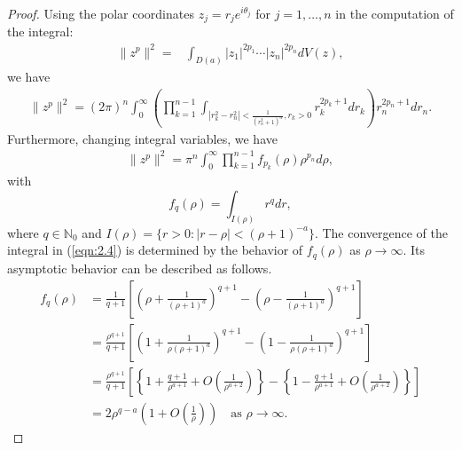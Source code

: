 \documentclass[12pt]{amsart}
\numberwithin{equation}{section}
\theoremstyle{definition}
\theoremstyle{remark}
\newcommand{\N}{{\mathbb N}}
\newcommand{\1}{{\bf 1}}
\begin{document}
\begin{proof}
Using the polar coordinates 
$z_j=r_j e^{i\theta_j}$ for $j=1,\ldots,n$
in the computation of the integral:
\begin{equation*}
\begin{split}
\|z^p\|^2=&\int_{D(a)} 
|z_1|^{2p_1} \cdots |z_n|^{2p_n}dV(z), 
\end{split}
\end{equation*}
we have 
\begin{equation*}
\begin{split}
\|z^p\|^2=
(2\pi)^n \int_0^{\infty} 
\left(
\prod_{k=1}^{n-1} 
\int_{|r_k^2-r_n^2|<\frac{1}{(r_n^2+1)^{\alpha}},r_k>0} 
r_k^{2p_k+1}dr_k
\right)
r_n^{2p_n+1} dr_n. 
\end{split}
\end{equation*}
Furthermore, 
changing integral variables, 
we have  
\begin{equation}\label{eqn:2.4}
\begin{split}
\|z^p\|^2=\pi^n \int_0^{\infty} 
\prod_{k=1}^{n-1} f_{p_k}(\rho)
\rho^{p_n} d\rho, 
\end{split}
\end{equation}
with
%
\begin{equation*}
f_q(\rho) = 
\int_{I(\rho)} 
r^{q}dr, 
\end{equation*}
where $q\in\N_0$ and 
$
I(\rho)=\{r>0: |r-\rho|<(\rho+1)^{-a}\}.
$
The convergence of the integral in (\ref{eqn:2.4})
is determined by the behavior of 
$f_q(\rho)$ as $\rho\to\infty$.
Its asymptotic behavior can be described as follows.
\begin{equation*} 
\begin{split}
f_q(\rho)&=
\frac{1}{q+1}
\left[
\left(
\rho+\frac{1}{(\rho+1)^{a}}
\right)^{q+1}
-
\left(
\rho-\frac{1}{(\rho+1)^{a}}
\right)^{q+1}
\right] \\
&=\frac{\rho^{q+1}}{q+1}
\left[
\left(1+\frac{1}{\rho(\rho+1)^{a}}\right)^{q+1}- 
\left(1-\frac{1}{\rho(\rho+1)^{a}}\right)^{q+1}
\right] \\
&=\frac{\rho^{q+1}}{q+1}
\left[
\left\{
1+\frac{q+1}{\rho^{a+1}}
+O\left(
\frac{1}{\rho^{a+2}}
\right)
\right\}- 
\left\{
1-\frac{q+1}{\rho^{a+1}}
+O\left(
\frac{1}{\rho^{a+2}}
\right)
\right\}
\right] \\
&=2\rho^{q-a}
\left(1+O\left(
\frac{1}{\rho}
\right)
\right) \quad \mbox{as $\rho\to\infty$.}
\end{split}
\end{equation*}
%

\end{proof}
\end{document}
